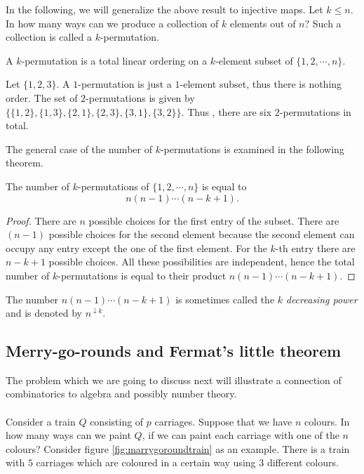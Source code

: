 In the following, we will generalize the above result to injective maps. Let $k \leq n$. In how many ways can we produce a collection 
of $k$ elements out of $n$? Such a collection is called a $k$-permutation.

\begin{defn}[$k$-permutation]
A $k$-permutation is a total linear ordering on a $k$-element subset of $\{1, 2, \cdots, n\}$.
\end{defn}

\begin{exmp}
Let $\{1,2 ,3\}$. A $1$-permutation is just a $1$-element subset, thus there is nothing order. The set of 
$2$-permutations is given by $\{\{1,2\}, \{1,3\}, \{2,1\}, \{2,3\}, \{3,1\}, \{3,2\}\}$.
Thus , there are six $2$-permutations in total.
\end{exmp}

\newpage

The general case of the number of $k$-permutations is examined in the following theorem.

\begin{theorem}
The number of $k$-permutations of $\{1,2, \cdots, n\}$ is equal to $$n(n-1)\cdots (n-k+1).$$
\end{theorem}

\begin{proof}
There are $n$ possible choices for the first entry of the subset. There are $(n-1)$ possible choices for the second element because the second element can occupy any entry except the one of the first element. 
For the $k$-th entry there are $n-k+1$ possible choices. All these possibilities are independent, hence
the total number of $k$-permutations is equal to their product $n(n-1)\cdots (n-k+1)$.
\end{proof}

The number $n(n-1)\cdots (n-k+1)$ is sometimes called the $k$ \textit{decreasing power} and is denoted by $n^{\downarrow k}$.

\subsection{Merry-go-rounds and Fermat's little theorem}
The problem which we are going to discuss next will illustrate a connection of combinatorics to algebra and possibly number theory.
\\
\\
Consider a train $Q$ consisting of $p$ carriages. Suppose that we have $n$ colours. In how many ways can we paint $Q$, if we can paint 
each carriage with one of the $n$ colours? Consider figure \ref{fig:marrygoroundtrain} as an example. There is a train with $5$ carriages which
are coloured in a certain way using $3$ different colours.

